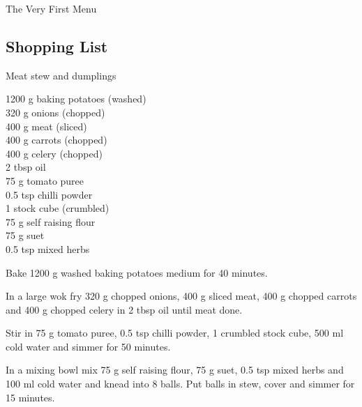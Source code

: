 
    
		\begin{menu}{The Very First Menu}
    
    \subsection*{Shopping List}
    
    
    
    
    
    
    
    \clearpage
  
    \begin{recipe}{2}{Meat stew and dumplings}%
    
		\begin{ingredients}
		1200 g baking potatoes (washed) \\
	320 g onions (chopped) \\
	400 g meat (sliced) \\
	400 g carrots (chopped) \\
	400 g celery (chopped) \\
	2 tbsp oil  \\
	75 g tomato puree  \\
	0.5 tsp chilli powder  \\
	1  stock cube (crumbled) \\
	75 g self raising flour  \\
	75 g suet  \\
	0.5 tsp mixed herbs  \\
	
		\end{ingredients}
	
    \begin{instructions}
    \item 
      Bake 1200 g washed baking potatoes 
      medium for 40 minutes.
    \item 
				In a large wok fry
				320 g chopped onions,
				400 g sliced meat,
				400 g chopped carrots
				and
				400 g chopped celery
				in
				2 tbsp  oil
				until meat done.
			\item 
				Stir in
				75 g  tomato puree,
				0.5 tsp  chilli powder,
				1  crumbled stock cube,
				500 ml  cold water
				and simmer for 50 minutes.
			\item 
				In a mixing bowl mix
				75 g  self raising flour,
				75 g  suet,
				0.5 tsp  mixed herbs
				and
				100 ml  cold water
				and knead into 8 balls.
				Put balls in stew, cover and
				simmer for 15 minutes.
			

\end{instructions}
\end{recipe}
\end{menu}
